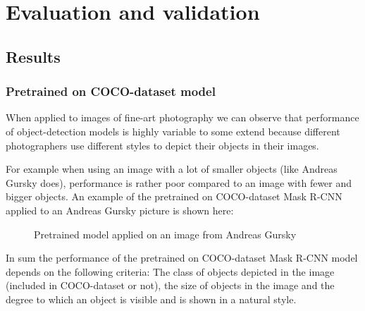 \chapter{Evaluation and validation}
\label{ch:Eval}

\section{Results}

\subsection{Pretrained on COCO-dataset model}

When applied to images of fine-art photography we can observe that performance of object-detection models is highly variable to some extend because different photographers use different styles to depict their objects in their images.

For example when using an image with a lot of smaller objects (like Andreas Gursky does), performance is rather poor compared to an image with fewer and bigger objects. An example of the pretrained on COCO-dataset Mask R-CNN applied to an Andreas Gursky picture is shown here:

\begin{figure}[H]
	\caption{\label{fig:fpn} Pretrained model applied on an image from Andreas Gursky}
\end{figure}
	
In sum the performance of the pretrained on COCO-dataset Mask R-CNN model depends on the following criteria: The class of objects depicted in the image (included in COCO-dataset or not), the size of objects in the image and the degree to which an object is visible and is shown in a natural style.


